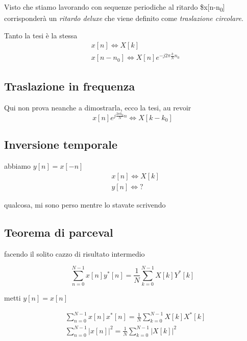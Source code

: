 \documentclass[11pt]{article}
\begin{document}
Visto che stiamo lavorando con sequenze periodiche al ritardo \$x[n-n\textsubscript{0}]
corrisponderà un \textit{ritardo deluxe} che viene definito come
\textit{traslazione circolare}.

Tanto la tesi è la stessa
\begin{align*}
& x[n] \iff X[k] \\
& x[n-n_0] \iff X[n] e^{-j2\pi \frac{k}{N} n_0}
\end{align*}

\subsection{Traslazione in frequenza}
\label{sec:org8610a2c}

Qui non prova neanche a dimostrarla, ecco la tesi, au revoir
\[ x[n] e^{j\frac{2\pi k_0}{N}n} \iff X[k - k_0] \]

\subsection{Inversione temporale}
\label{sec:org87abc05}

abbiamo \(y[n] = x[-n]\)
\begin{align*}
& x[n] \iff X[k] \\
& y[n] \iff \text{?}
\end{align*}

qualcosa, mi sono perso mentre lo stavate scrivendo

\subsection{Teorema di parceval}
\label{sec:orgce559cb}

facendo il solito cazzo di risultato intermedio

\[
\sum_{n=0}^{N-1} x[n]y^*[n] =
\frac{1}{N} \sum_{k=0}^{N-1}X[k]Y^*[k]
\]

metti \(y[n] = x[n]\)


\begin{align*}
& \sum_{n=0}^{N-1} x[n]x^*[n] =
\frac{1}{N} \sum_{k=0}^{N-1}X[k]X^*[k] \\
& \sum_{n=0}^{N-1} \lvert x[n] \rvert ^2 =
\frac{1}{N} \sum_{k=0}^{N-1} \lvert X[k] \rvert ^2 \\
\end{align*}
\end{document}
